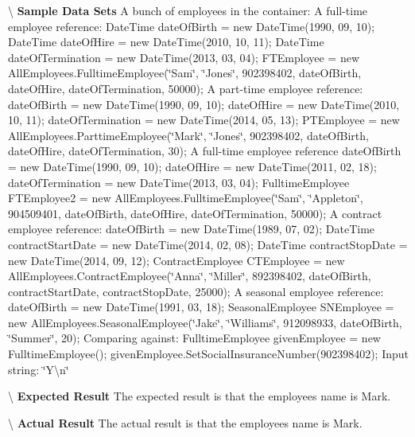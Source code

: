 \textbackslash{} {\bfseries  Sample Data Sets} A bunch of employees in the container\+: A full-\/time employee reference\+: Date\+Time date\+Of\+Birth = new Date\+Time(1990, 09, 10); Date\+Time date\+Of\+Hire = new Date\+Time(2010, 10, 11); Date\+Time date\+Of\+Termination = new Date\+Time(2013, 03, 04); F\+T\+Employee = new All\+Employees.\+Fulltime\+Employee(\char`\"{}\+Sam\char`\"{}, \char`\"{}\+Jones\char`\"{}, 902398402, date\+Of\+Birth, date\+Of\+Hire, date\+Of\+Termination, 50000); A part-\/time employee reference\+: date\+Of\+Birth = new Date\+Time(1990, 09, 10); date\+Of\+Hire = new Date\+Time(2010, 10, 11); date\+Of\+Termination = new Date\+Time(2014, 05, 13); P\+T\+Employee = new All\+Employees.\+Parttime\+Employee(\char`\"{}\+Mark\char`\"{}, \char`\"{}\+Jones\char`\"{}, 902398402, date\+Of\+Birth, date\+Of\+Hire, date\+Of\+Termination, 30); A full-\/time employee reference date\+Of\+Birth = new Date\+Time(1990, 09, 10); date\+Of\+Hire = new Date\+Time(2011, 02, 18); date\+Of\+Termination = new Date\+Time(2013, 03, 04); Fulltime\+Employee F\+T\+Employee2 = new All\+Employees.\+Fulltime\+Employee(\char`\"{}\+Sam\char`\"{}, \char`\"{}\+Appleton\char`\"{}, 904509401, date\+Of\+Birth, date\+Of\+Hire, date\+Of\+Termination, 50000); A contract employee reference\+: date\+Of\+Birth = new Date\+Time(1989, 07, 02); Date\+Time contract\+Start\+Date = new Date\+Time(2014, 02, 08); Date\+Time contract\+Stop\+Date = new Date\+Time(2014, 09, 12); Contract\+Employee C\+T\+Employee = new All\+Employees.\+Contract\+Employee(\char`\"{}\+Anna\char`\"{}, \char`\"{}\+Miller\char`\"{}, 892398402, date\+Of\+Birth, contract\+Start\+Date, contract\+Stop\+Date, 25000); A seasonal employee reference\+: date\+Of\+Birth = new Date\+Time(1991, 03, 18); Seasonal\+Employee S\+N\+Employee = new All\+Employees.\+Seasonal\+Employee(\char`\"{}\+Jake\char`\"{}, \char`\"{}\+Williams\char`\"{}, 912098933, date\+Of\+Birth, \char`\"{}\+Summer\char`\"{}, 20); Comparing against\+: Fulltime\+Employee given\+Employee = new Fulltime\+Employee(); given\+Employee.\+Set\+Social\+Insurance\+Number(902398402); Input string\+: \char`\"{}\+Y\textbackslash{}n\char`\"{}

\textbackslash{} {\bfseries  Expected Result} The expected result is that the employee\textquotesingle{}s name is Mark.

\textbackslash{} {\bfseries  Actual Result} The actual result is that the employee\textquotesingle{}s name is Mark. \hypertarget{class_the_company_1_1_tests_1_1_select_employee_tests_a83e1e05af3c20bb0fda16478b24639b0}{}
